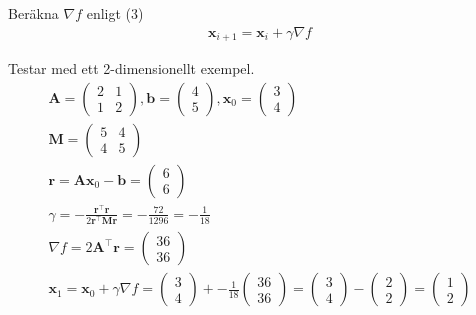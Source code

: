 \documentclass{article}
\begin{document}
    Beräkna $\nabla f$ enligt (3)
\begin{gather*}
        \mathbf{x}_{i+1} = \mathbf{x}_i + \gamma \nabla f 
\end{gather*}

\newpage
Testar med ett 2-dimensionellt exempel.
\begin{gather*}
    \mathbf{A} = \left(
    \begin{matrix}
        2 & 1 \\
        1 & 2
    \end{matrix}
    \right),
    \mathbf{b}=\left(
    \begin{matrix}
        4 \\
        5
    \end{matrix}
    \right),
    \mathbf{x}_0=\left(
    \begin{matrix}
        3 \\
        4
    \end{matrix}
    \right)\\
    \mathbf{M} = \left(
    \begin{matrix}
        5 & 4 \\
        4 & 5
    \end{matrix}
    \right)\\
    \mathbf{r}=\mathbf{A}\mathbf{x}_0-\mathbf{b} = \left(
    \begin{matrix}
        6 \\
        6
    \end{matrix}
    \right)\\
    \gamma = - \frac{\mathbf{r}^\intercal \mathbf{r}}{2 \mathbf{r}^\intercal \mathbf{M} \mathbf{r}} = -\frac{72}{1296} = -\frac{1}{18}\\
    \nabla f = 2 \mathbf{A}^\intercal \mathbf{r} = \left(
    \begin{matrix}
        36 \\
        36
    \end{matrix}
    \right)\\
    \mathbf{x}_1 = \mathbf{x}_0 + \gamma \nabla f = \left(
    \begin{matrix}
        3 \\
        4
    \end{matrix}
    \right)
    + -\frac{1}{18} \left(
    \begin{matrix}
        36 \\
        36
    \end{matrix}
    \right) = \left(
    \begin{matrix}
        3 \\
        4
    \end{matrix}
    \right) - \left(
    \begin{matrix}
        2 \\
        2
    \end{matrix}
    \right) = \left(
    \begin{matrix}
        1 \\
        2
    \end{matrix}
    \right)
\end{gather*}
\end{document}
